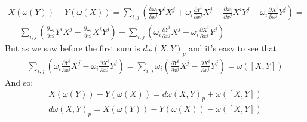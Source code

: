 \documentclass{article}
\begin{document}
\begin{equation}
\begin{gathered}
    X(\omega(Y)) - Y(\omega(X)) = \sum_{i, j} \left(\frac{\partial \omega_i}{\partial x^j} Y^i X^j + \omega_i\frac{\partial Y^i}{\partial x^j} X^j - \frac{\partial \omega_i}{\partial x^j} X^i Y^j - \omega_i\frac{\partial X^i}{\partial x^j} Y^j\right) = \\ =
    \sum_{i, j} \left(\frac{\partial \omega_i}{\partial x^j} Y^i X^j - \frac{\partial \omega_i}{\partial x^j} X^i Y^j\right) +
    \sum_{i, j} \left(\omega_i\frac{\partial Y^i}{\partial x^j} X^j - \omega_i\frac{\partial X^i}{\partial x^j} Y^j\right)
\end{gathered}
\end{equation}
But as we saw before the first sum is $d\omega(X, Y)_p$ and it's easy to see that
\begin{equation}
\begin{gathered}
    \sum_{i, j} \left(\omega_i\frac{\partial Y^i}{\partial x^j} X^j - \omega_i\frac{\partial X^i}{\partial x^j} Y^j\right) =
    \sum_{i, j} \omega_i\left(\frac{\partial Y^i}{\partial x^j} X^j - \frac{\partial X^i}{\partial x^j} Y^j\right) = \omega([X, Y])
\end{gathered}
\end{equation}
And so:
\begin{equation}
\begin{gathered}
    X(\omega(Y)) - Y(\omega(X)) = d\omega(X, Y)_p + \omega([X, Y])
    \\
    d\omega(X, Y)_p = X(\omega(Y)) - Y(\omega(X)) - \omega([X, Y])
\end{gathered}
\end{equation}
\end{document}

